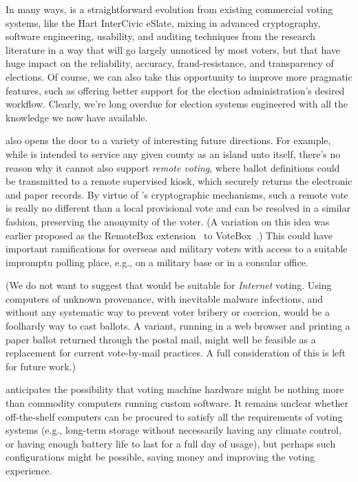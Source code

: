 \label{sec:future}
\label{sec:conclusion}

In many ways, \projname is a straightforward evolution from existing
commercial voting systems, like the Hart InterCivic eSlate, mixing in
advanced cryptography, software engineering, usability, and auditing
techniques from the research literature in a way that will go largely
unnoticed by most voters, but that have huge impact on the
reliability, accuracy, fraud-resistance, and transparency of
elections. Of course, we can also take this opportunity to improve
more pragmatic features, such as offering better support for the
election administration's desired workflow.
Clearly, we're long overdue for election
systems engineered with all the knowledge we now have available.

\projname also opens the door to a variety of interesting future
directions. 
For example, while \projname is intended to service any
given county as an island unto itself, there's no reason why it cannot
also support {\em remote voting}, where ballot definitions could be
transmitted to a remote supervised kiosk, which securely returns the electronic and paper records.
By virtue of \projname's cryptographic mechanisms, such a remote
vote is really no different than a local provisional vote and can be
resolved in a similar fashion, preserving the anonymity of the
voter. (A variation on this idea was earlier proposed as the RemoteBox
extension~\cite{remotebox08} to VoteBox~\cite{sandler08votebox}.)
This could have important ramifications for overseas and military
voters with access to a suitable impromptu polling place, e.g., on a
military base or in a consular office.

(We do not want to suggest that \projname
would be suitable for {\em Internet} voting. Using computers of
unknown provenance, with inevitable malware infections, and
without any systematic way to prevent voter bribery or coercion,
would be a foolhardy way to cast ballots. A \projname variant, running
in a web browser and printing a paper ballot returned through the
postal mail, might well be feasible as a replacement for current
vote-by-mail practices. A full consideration of this is left for
future work.)

\projname anticipates the possibility that voting machine
hardware might be nothing more than commodity computers running custom
software. It remains unclear whether off-the-shelf computers can be
procured to satisfy all the requirements of voting systems (e.g.,
long-term storage without necessarily having any climate control, or
having enough battery life to last for a full day of usage), but
perhaps such configurations might be possible, saving money and
improving the voting experience.



